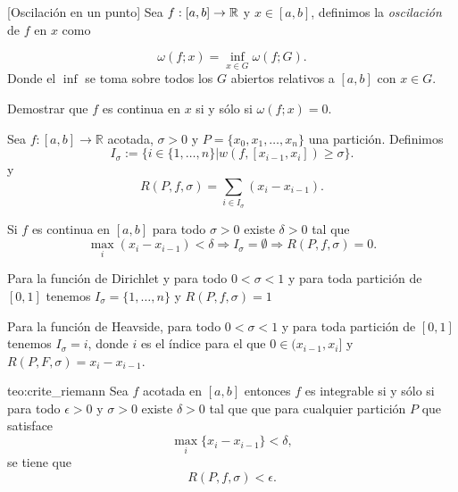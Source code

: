 \begin{definicion}{}[Oscilación en un punto] Sea $f:[a,b]\to\mathbb{R}$ y $x\in [a,b]$, definimos la  \emph{oscilación} de $f$ en $x$ como

\[
 \omega(f;x)=\inf\limits_{x\in G}\omega(f;G).
\]
Donde el $\inf$ se toma sobre todos los $G$ abiertos relativos a $[a,b]$ con $x\in G$.  

 
\end{definicion}

\begin{ejercicio}{}
 Demostrar que $f$ es continua en $x$ si y sólo si $\omega(f;x)=0$.
\end{ejercicio}




\begin{definicion}{} Sea $f:[a,b]\to\mathbb{R}$ acotada, $\sigma>0$ y $P=\{x_0,x_1,\ldots,x_n\}$ una partición. Definimos
\[
 I_{\sigma}:=\{i\in\{1,\ldots,n\}|w(f,[x_{i-1},x_i])\geq\sigma\}.
\]
y
\[
 R(P,f,\sigma)=\sum_{i\in I_{\sigma}}(x_i-x_{i-1}).
\]
\end{definicion}





\begin{proposicion}{} Si $f$ es continua en $[a,b]$ para todo $\sigma>0$ existe $\delta>0$ tal que 
\[
\max_i(x_i-x_{i-1})<\delta\Rightarrow I_{\sigma}=\emptyset\Rightarrow R(P,f,\sigma)=0. 
\]

 
\end{proposicion}

\begin{ejemplo}{} Para la función de Dirichlet y para todo $0<\sigma<1$ y para toda partición de $[0,1]$ tenemos $I_{\sigma}=\{1,\ldots,n\}$ y $R(P,f,\sigma)=1$
 
\end{ejemplo}

\begin{ejemplo}{} Para la función de Heavside,   para todo $0<\sigma<1$ y para toda partición de $[0,1]$ tenemos $I_{\sigma}=i$, donde $i$ es el índice para el que $0\in (x_{i-1},x_i]$ y $R(P,F,\sigma)=x_i-x_{i-1}$.
 
\end{ejemplo}

\begin{teorema}{teo:crite_riemann} Sea $f$ acotada en $[a,b]$ entonces $f$ es integrable si y sólo si  para todo $\epsilon>0$ y $\sigma>0$ existe $\delta>0$ tal que que para cualquier partición $P$ que satisface
\[\max_i\{x_i-x_{i-1}\}<\delta,\]
se tiene que
\[R(P,f,\sigma)<\epsilon.\]
\end{teorema}


